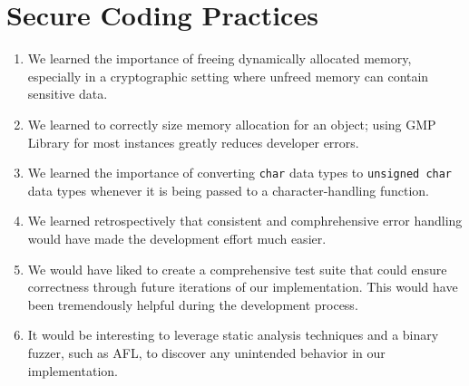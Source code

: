 \documentclass[a4paper]{article}
\begin{document}
\section{Secure Coding Practices}

\begin{enumerate}
    \item We learned the importance of freeing dynamically allocated memory, especially in a cryptographic setting where unfreed memory can contain sensitive data.
        
    \item We learned to correctly size memory allocation for an object; using GMP Library for most instances greatly reduces developer errors.

    \item We learned the importance of converting {\tt char} data types to {\tt unsigned char} data types whenever it is being passed to a character-handling function.

    \item We learned retrospectively that consistent and comphrehensive error handling would have made the development effort much easier.

    \item We would have liked to create a comprehensive test suite that could ensure correctness through future iterations of our implementation. This would have been tremendously helpful during the development process.

    \item It would be interesting to leverage static analysis techniques and a binary fuzzer, such as AFL, to discover any unintended behavior in our implementation.
\end{enumerate}
\end{document}
